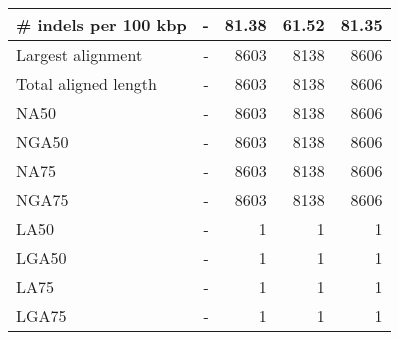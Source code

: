 \documentclass[12pt,a4paper]{article}
\begin{document}
\begin{table}[ht]
\begin{center}
\begin{tabular}{|l*{4}{|r}|}
\# indels per 100 kbp & - & 81.38 & 61.52 & 81.35 \\ \hline
Largest alignment & - & 8603 & 8138 & 8606 \\ \hline
Total aligned length & - & 8603 & 8138 & 8606 \\ \hline
NA50 & - & 8603 & 8138 & 8606 \\ \hline
NGA50 & - & 8603 & 8138 & 8606 \\ \hline
NA75 & - & 8603 & 8138 & 8606 \\ \hline
NGA75 & - & 8603 & 8138 & 8606 \\ \hline
LA50 & - & 1 & 1 & 1 \\ \hline
LGA50 & - & 1 & 1 & 1 \\ \hline
LA75 & - & 1 & 1 & 1 \\ \hline
LGA75 & - & 1 & 1 & 1 \\ \hline
\end{tabular}
\end{center}
\end{table}
\end{document}
